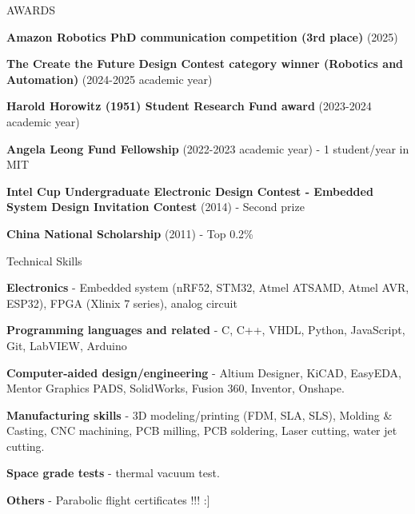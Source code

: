 \documentclass{resume} %
\begin{document}
\begin{rSection}{AWARDS}
\begin{itemlabel}
\item \textbf{Amazon Robotics PhD communication competition (3rd place)} (2025)
\smallskip
\smallskip

\item \textbf{The Create the Future Design Contest category winner (Robotics and Automation)} (2024-2025 academic year)
\smallskip
\smallskip

\begin{itemlabel}
\item \textbf{Harold Horowitz (1951) Student Research Fund award} (2023-2024 academic year)
\smallskip
\smallskip

\item \textbf{Angela Leong Fund Fellowship} (2022-2023 academic year) - 1 student/year in MIT
\smallskip
\smallskip

\item \textbf{Intel Cup Undergraduate Electronic Design Contest - Embedded System Design Invitation Contest} (2014) - Second prize
\smallskip
\smallskip

\item \textbf{China National Scholarship} (2011) - Top 0.2\%
\smallskip
\smallskip

\end{itemlabel}
\end{itemlabel}
\end{rSection}


\begin{rSection}{Technical Skills}

\begin{itemlabel}

\item \textbf{Electronics} - Embedded system (nRF52, STM32, Atmel ATSAMD, Atmel AVR, ESP32), FPGA (Xlinix 7 series), analog circuit
\item \textbf{Programming languages and related} - C, C++, VHDL, Python, JavaScript, Git, LabVIEW, Arduino
\item \textbf{Computer-aided design/engineering} - Altium Designer, KiCAD, EasyEDA, Mentor Graphics PADS, SolidWorks, Fusion 360, Inventor, Onshape.
\item \textbf{Manufacturing skills} - 3D modeling/printing (FDM, SLA, SLS), Molding \& Casting, CNC machining, PCB milling, PCB soldering, Laser cutting, water jet cutting.
\item \textbf{Space grade tests} - thermal vacuum test.
\item \textbf{Others} - Parabolic flight certificates !!! :]
\end{itemlabel}
\end{rSection}
\end{document}
